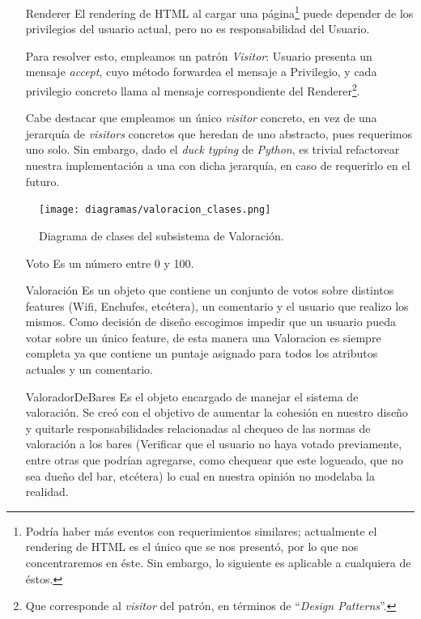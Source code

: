 \begin{itemize}
    \item[Renderer] El rendering de HTML al cargar una página\footnote{Podría haber más eventos con requerimientos similares; actualmente el rendering de HTML es el único que se nos presentó, por lo que nos concentraremos en éste. Sin embargo, lo siguiente es aplicable a cualquiera de éstos.} puede depender de los privilegios del usuario actual, pero no es responsabilidad del Usuario.
        \par Para resolver esto, empleamos un patrón \textit{Visitor}: Usuario presenta un mensaje \textit{accept}, cuyo método forwardea el mensaje a Privilegio, y cada privilegio concreto llama al mensaje correspondiente del Renderer\footnote{Que corresponde al \textit{visitor} del patrón, en términos de ``\textit{Design Patterns}''.}.
    \par Cabe destacar que empleamos un único \textit{visitor} concreto, en vez de una jerarquía de \textit{visitors} concretos que heredan de uno abstracto, pues requerimos uno solo. Sin embargo, dado el \textit{duck typing} de \textit{Python}, es trivial refactorear nuestra implementación a una con dicha jerarquía, en caso de requerirlo en el futuro.

\end{itemize}

\begin{figure}[H]
  \centering
  \texttt{[image: diagramas/valoracion\_clases.png]}
  \caption{\normalfont Diagrama de clases del subsistema de Valoración.}
\end{figure} 

\begin{itemize}

\item[Voto] Es un número entre 0 y 100.

\item[Valoración] Es un objeto que contiene un conjunto de votos sobre distintos features (Wifi,
Enchufes, etcétera), un comentario y el usuario que realizo los mismos. Como decisión de diseño escogimos impedir que un usuario pueda votar sobre un único feature, de esta manera una Valoracion es siempre completa ya que contiene un puntaje asignado para todos los atributos actuales y un comentario.

\item[ValoradorDeBares] Es el objeto encargado de manejar el sistema de valoración. Se creó con el objetivo de aumentar la cohesión en nuestro diseño y quitarle responsabilidades relacionadas al chequeo de las normas de valoración a los bares (Verificar que el usuario no haya votado previamente, entre otras que podrían agregarse, como chequear que este logueado, que no sea dueño del bar, etcétera) lo cual en nuestra opinión no modelaba la realidad.

\end{itemize}



